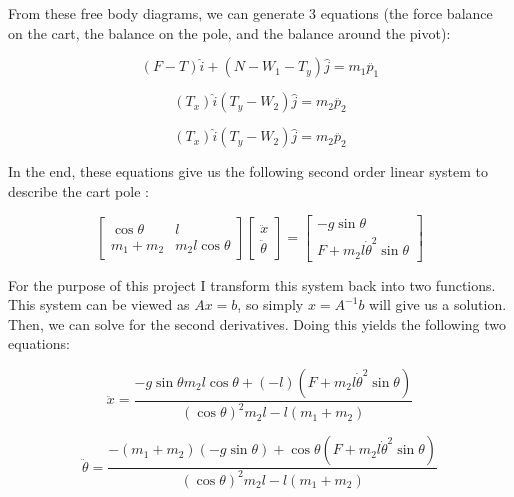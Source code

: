\documentclass[12pt]{article}
\begin{document}
From these free body diagrams, we can generate 3 equations (the force balance on the cart,
the balance on the pole, and the balance around the pivot):

\begin{equation} \label{eq:1}
(F - T) \hat{i} + (N - W_1 - T_y) \hat{j} = m_1 \ddot{p_1}
\end{equation}

\begin{equation} \label{eq:2}
(T_x) \hat{i} (T_y - W_2 ) \hat{j} = m_2  \ddot{p_2}
\end{equation}

\begin{equation} \label{eq:3}
(T_x) \hat{i} (T_y - W_2 ) \hat{j} = m_2  \ddot{p_2}
\end{equation}

In the end, these equations give us the following second order linear system to
describe the cart pole \cite{mattkelly} \cite{underactuated}:

\begin{equation} \label{eq:4}
\begin{bmatrix}
\cos \theta & l \\
m_1 + m_2 & m_2 l \cos \theta
\end{bmatrix}
\begin{bmatrix}
\ddot{x} \\
\ddot{\theta}
\end{bmatrix}
=
\begin{bmatrix}
- g \sin \theta \\
F + m_2 l \dot{\theta}^2 \sin \theta
\end{bmatrix}
\end{equation}

For the purpose of this project I transform this system back into two functions.
This system can be viewed as $A x = b$, so simply $x = A^{-1} b$ will give us
a solution. Then, we can solve for the second derivatives. Doing this yields the following
two equations:

\begin{equation} \label{eq:5}
\ddot{x} = \frac{-g \sin \theta m_2 l \cos \theta + (-l)(F + m_2 l \dot{\theta}^2 \sin \theta) }{ (\cos \theta)^2 m_2 l - l(m_1 + m_2) }
\end{equation}

\begin{equation} \label{eq:6}
\ddot{\theta} = \frac{-(m_1 + m_2)(-g \sin \theta) + \cos \theta (F + m_2 l \dot{\theta}^2 \sin \theta) }{ (\cos \theta)^2 m_2 l - l(m_1 + m_2) }
\end{equation}
\end{document}
